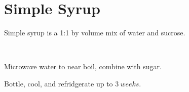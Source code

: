 \section[Simple Syrup]{Simple Syrup}\label{simpleSyrup}

\begin{recipestats}[
        servings=$\onehalf~C$,
        preptime=5~\minute,
        original=\citefield{cocktailSeminars2021}{title}\cite{cocktailSeminars2021},
    ]
\end{recipestats}

\begin{recipeabstract}
    Simple syrup is a 1:1 by volume mix of water and sucrose.
\end{recipeabstract}

\begin{ingredientcolumns}[1]
    \begin{ingredientblock}
        \\
    \end{ingredientblock}
\end{ingredientcolumns}

\begin{preparation}
\item Microwave water to near boil, combine with sugar.
\item Bottle, cool, and refridgerate up to $3~weeks$.
\end{preparation}

\recipeend%

